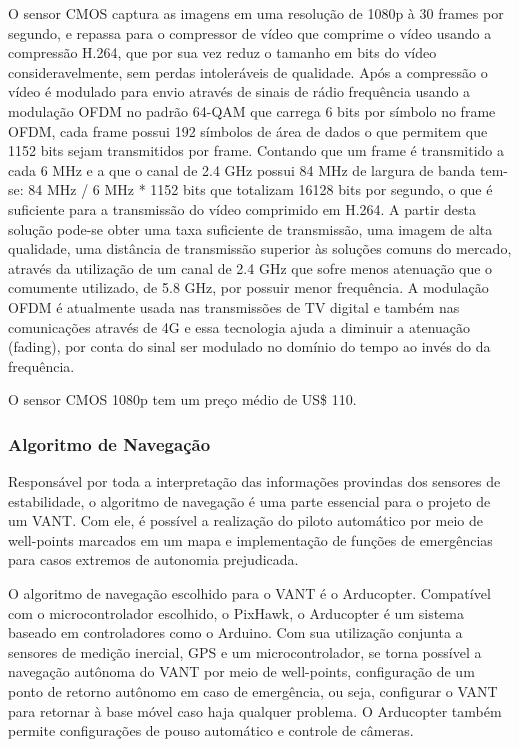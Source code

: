 O sensor CMOS captura as imagens em uma resolução de 1080p à 30 frames por segundo, e repassa para o compressor de vídeo que comprime o vídeo usando a compressão H.264, que por sua vez reduz o tamanho em bits do vídeo consideravelmente, sem perdas intoleráveis de qualidade. Após a compressão o vídeo é modulado para envio através de sinais de rádio frequência usando a modulação OFDM no padrão 64-QAM que carrega 6 bits por símbolo no frame OFDM, cada frame possui 192 símbolos de área de dados o que permitem que 1152 bits sejam transmitidos por frame. Contando que um frame é transmitido a cada 6 MHz e a que o canal de 2.4 GHz possui 84 MHz de largura de banda tem-se: 84 MHz / 6 MHz * 1152 bits que totalizam 16128 bits por segundo, o que é suficiente para a transmissão do vídeo comprimido em H.264. A partir desta solução pode-se obter uma taxa suficiente de transmissão, uma imagem de alta qualidade, uma distância de transmissão superior às soluções comuns do mercado, através da utilização de um canal de 2.4 GHz que sofre menos atenuação que o comumente utilizado, de 5.8 GHz, por possuir menor frequência. A modulação OFDM é atualmente usada nas transmissões de TV digital e também nas comunicações através de 4G e essa tecnologia ajuda a diminuir a atenuação (fading), por conta do sinal ser modulado no domínio do tempo ao invés do da frequência. \cite{funcao2012}

O sensor CMOS 1080p tem um preço médio de US\$ 110.


\subsubsection{Algoritmo de Navegação}

Responsável por toda a interpretação das informações provindas dos sensores de estabilidade, o algoritmo de navegação é uma parte essencial para o projeto de um VANT. Com ele, é possível a realização do piloto automático por meio de well-points marcados em um mapa e implementação de funções de emergências para casos extremos de autonomia prejudicada.

O algoritmo de navegação escolhido para o VANT é o Arducopter. Compatível com o microcontrolador escolhido, o PixHawk, o Arducopter é um sistema baseado em controladores como o Arduino. Com sua utilização conjunta a sensores de medição inercial, GPS e um microcontrolador, se torna possível a navegação autônoma do VANT por meio de well-points, configuração de um ponto de retorno autônomo em caso de emergência, ou seja, configurar o VANT para retornar à base móvel caso haja qualquer problema. O Arducopter também permite configurações de pouso automático e controle de câmeras. \cite{arducopter2014}


